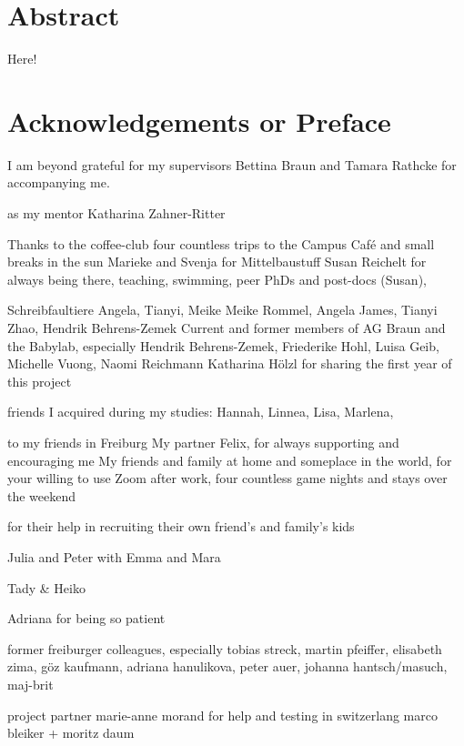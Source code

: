\linespread{1.5}
\setcounter{page}{1}  %

\chapter*{Abstract}\label{abstract}
Here!



\chapter*{Acknowledgements or Preface}\label{acknowledgements}


I am beyond grateful for my supervisors Bettina Braun and Tamara Rathcke for accompanying me.

as my mentor Katharina Zahner-Ritter

Thanks to the coffee-club four countless trips to the Campus Café and small breaks in the sun
Marieke and Svenja for Mittelbaustuff
Susan Reichelt for always being there, teaching, swimming,
peer PhDs and post-docs (Susan),

Schreibfaultiere Angela, Tianyi, Meike
Meike Rommel, Angela James, Tianyi Zhao, Hendrik Behrens-Zemek
Current and former members of AG Braun and the Babylab, especially Hendrik Behrens-Zemek, Friederike Hohl, Luisa Geib, Michelle Vuong, Naomi Reichmann
Katharina Hölzl for sharing the first year of this project

friends I acquired during my studies: Hannah, Linnea, Lisa, Marlena,

to my friends in Freiburg
My partner Felix, for always supporting and encouraging me
My friends and family at home and someplace in the world, for your willing to use Zoom after work, four countless game nights and stays over the weekend

for their help in recruiting their own friend's and family's kids

Julia and Peter with Emma and Mara


Tady \& Heiko

Adriana for being so patient


former freiburger colleagues, especially tobias streck, martin pfeiffer, elisabeth zima, göz kaufmann, adriana hanulikova, peter auer, johanna hantsch/masuch, maj-brit


project partner marie-anne morand
for help and testing in switzerlang marco bleiker + moritz daum

